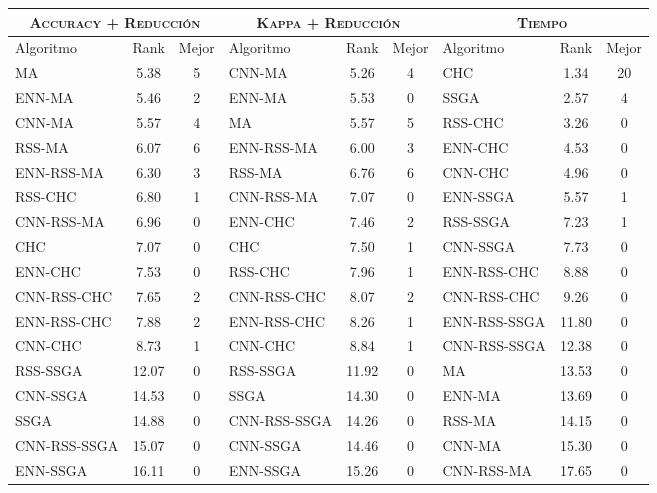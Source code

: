 \begin{table}[h!]
\centering
\begin{adjustbox}{max width =\textwidth}
\begin{tabular}{l c c|l c c|l c c}
\hline
\multicolumn{3}{c|}{\textsc{Accuracy + Reducción}}
	& \multicolumn{3}{c|}{\textsc{Kappa + Reducción}}
	& \multicolumn{3}{c}{\textsc{Tiempo}} \\
\hline
Algoritmo & Rank & Mejor & Algoritmo & Rank & Mejor & Algoritmo & Rank & Mejor \\
\hline
\hline

MA           & 5.38  & 5 & CNN-MA       & 5.26  & 4  & CHC          & 1.34 & 20 \\
ENN-MA       & 5.46  & 2 & ENN-MA       & 5.53  & 0  & SSGA         & 2.57 & 4 \\
CNN-MA       & 5.57  & 4 & MA           & 5.57  & 5  & RSS-CHC      & 3.26 & 0 \\
RSS-MA       & 6.07  & 6 & ENN-RSS-MA   & 6.00  & 3  & ENN-CHC      & 4.53 & 0 \\
ENN-RSS-MA   & 6.30  & 3 & RSS-MA       & 6.76  & 6  & CNN-CHC      & 4.96 & 0 \\
RSS-CHC      & 6.80  & 1 & CNN-RSS-MA   & 7.07  & 0  & ENN-SSGA     & 5.57 & 1 \\
CNN-RSS-MA   & 6.96  & 0 & ENN-CHC      & 7.46  & 2  & RSS-SSGA     & 7.23 & 1 \\
CHC          & 7.07  & 0 & CHC          & 7.50  & 1  & CNN-SSGA     & 7.73 & 0 \\
ENN-CHC      & 7.53  & 0 & RSS-CHC      & 7.96  & 1  & ENN-RSS-CHC  & 8.88 & 0 \\
CNN-RSS-CHC  & 7.65  & 2 & CNN-RSS-CHC  & 8.07  & 2  & CNN-RSS-CHC  & 9.26 & 0 \\
ENN-RSS-CHC  & 7.88  & 2 & ENN-RSS-CHC  & 8.26  & 1  & ENN-RSS-SSGA & 11.80 & 0 \\
CNN-CHC      & 8.73  & 1 & CNN-CHC      & 8.84  & 1  & CNN-RSS-SSGA & 12.38 & 0 \\
RSS-SSGA     & 12.07 & 0 & RSS-SSGA     & 11.92 & 0  & MA           & 13.53 & 0 \\
CNN-SSGA     & 14.53 & 0 & SSGA         & 14.30 & 0  & ENN-MA       & 13.69 & 0 \\
SSGA         & 14.88 & 0 & CNN-RSS-SSGA & 14.26 & 0  & RSS-MA       & 14.15 & 0 \\
CNN-RSS-SSGA & 15.07 & 0 & CNN-SSGA     & 14.46 & 0  & CNN-MA       & 15.30 & 0 \\
ENN-SSGA     & 16.11 & 0 & ENN-SSGA     & 15.26 & 0  & CNN-RSS-MA   & 17.65 & 0 \\

\end{tabular}
\end{adjustbox}
\end{table}

